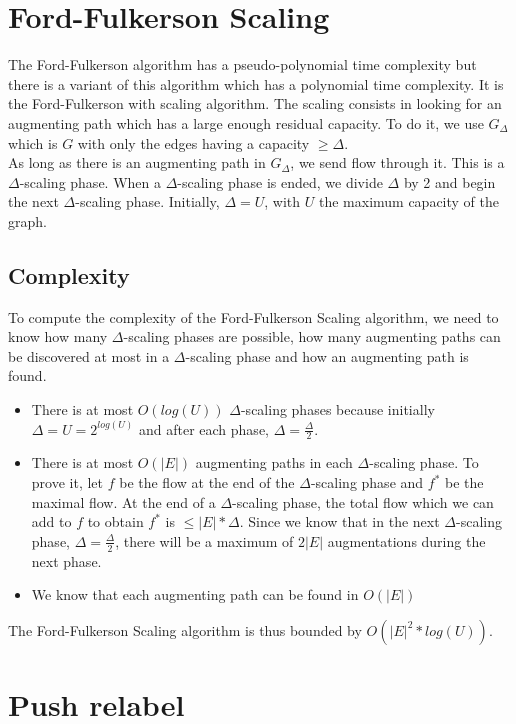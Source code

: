 \section{Ford-Fulkerson Scaling}
The Ford-Fulkerson algorithm has a pseudo-polynomial time complexity but there is a variant of this algorithm which has a polynomial time complexity. It is the Ford-Fulkerson with scaling algorithm. The scaling consists in looking for an augmenting path which has a large enough residual capacity. To do it, we use $G_\Delta$ which is $G$ with only the edges having a capacity $\geq \Delta$. \\

As long as there is an augmenting path in $G_\Delta$, we send flow through it. This is a $\Delta$-scaling phase. When a $\Delta$-scaling phase is ended, we divide $\Delta$ by 2 and begin the next $\Delta$-scaling phase. Initially, $\Delta = U$, with $U$ the maximum capacity of the graph.

\subsection{Complexity}
To compute the complexity of the Ford-Fulkerson Scaling algorithm, we need to know how many $\Delta$-scaling phases are possible, how many augmenting paths can be discovered at most in a $\Delta$-scaling phase and how an augmenting path is found.

\begin{itemize}
\item There is at most $O(log(U))$ $\Delta$-scaling phases because initially $\Delta = U = 2^{log(U)}$ and after each phase, $\Delta=\frac{\Delta}{2}$.
\item There is at most $O(|E|)$ augmenting paths in each $\Delta$-scaling phase. To prove it, let $f$ be the flow at the end of the $\Delta$-scaling phase and $f^*$ be the maximal flow. At the end of a $\Delta$-scaling phase, the total flow which we can add to $f$ to obtain $f^*$ is $\leq |E|*\Delta$. Since we know that in the next $\Delta$-scaling phase, $\Delta=\frac{\Delta}{2}$, there will be a maximum of $2|E|$ augmentations during the next phase.
\item We know that each augmenting path can be found in $O(|E|)$
\end{itemize}

The Ford-Fulkerson Scaling algorithm is thus bounded by $O(|E|^2* log(U))$.

\section{Push relabel}
